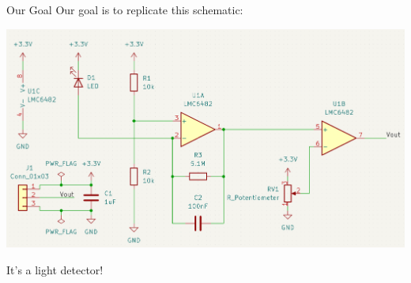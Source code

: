 \documentclass{beamer}
\begin{document}
\begin{frame}{Our Goal}
  Our goal is to replicate this schematic:

  \includegraphics[width=\textwidth]{images/schematic-goal.png}

  It's a light detector!
\end{frame}
\end{document}

